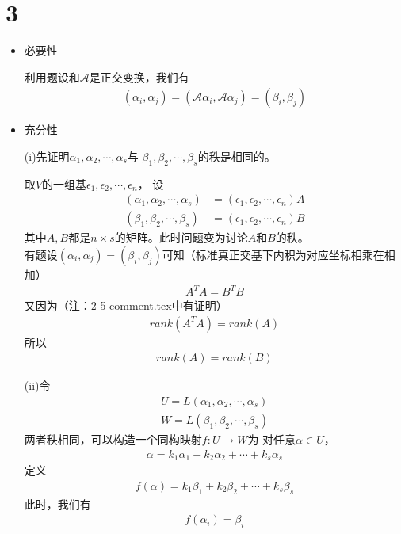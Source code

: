 \documentclass{article}
\begin{document}
\section*{3}

\begin{itemize}
  \item 必要性

        利用题设和$\mathscr{A}$是正交变换，我们有
        \begin{align*}
          (\alpha_i, \alpha_j) = (\mathscr{A} \alpha_i, \mathscr{A} \alpha_j) = (\beta_i, \beta_j)
        \end{align*}

  \item 充分性

        (i)先证明$\alpha_1, \alpha_2, \cdots, \alpha_s$与
        $\beta_1, \beta_2, \cdots, \beta_s$的秩是相同的。

        取$V$的一组基$\epsilon_1, \epsilon_2, \cdots, \epsilon_n$，
        设
        \begin{align*}
          (\alpha_1, \alpha_2, \cdots, \alpha_s) & = (\epsilon_1, \epsilon_2, \cdots, \epsilon_n) A \\
          (\beta_1, \beta_2, \cdots, \beta_s)    & = (\epsilon_1, \epsilon_2, \cdots, \epsilon_n) B
        \end{align*}
        其中$A, B$都是$n \times s$的矩阵。此时问题变为讨论$A$和$B$的秩。\\
        有题设$(\alpha_i, \alpha_j) = (\beta_i, \beta_j)$可知（标准真正交基下内积为对应坐标相乘在相加）
        \begin{align*}
          A^T A = B^T B
        \end{align*}
        又因为（注：2-5-comment.tex中有证明）
        \begin{align*}
          rank(A^T A) = rank(A)
        \end{align*}
        所以
        \begin{align*}
          rank(A) = rank(B)
        \end{align*}

        (ii)令
        \begin{align*}
          U = L(\alpha_1, \alpha_2, \cdots, \alpha_s) \\
          W = L(\beta_1, \beta_2, \cdots, \beta_s)
        \end{align*}
        两者秩相同，可以构造一个同构映射$f: U \to W$为
        对任意$\alpha \in U$，
        \begin{align*}
          \alpha = k_1 \alpha_1 + k_2 \alpha_2 + \cdots + k_s \alpha_s
        \end{align*}
        定义
        \begin{align*}
          f(\alpha) = k_1 \beta_1 + k_2 \beta_2 + \cdots + k_s \beta_s
        \end{align*}
        此时，我们有
        \begin{align*}
          f(\alpha_i) = \beta_i
        \end{align*}


\end{itemize}
\end{document}

